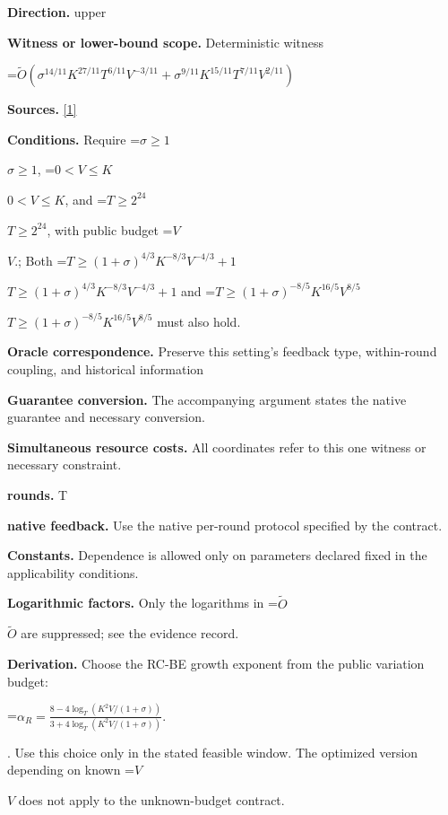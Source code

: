 \documentclass[10pt,a4paper]{article}
\newcommand{\AtlasMath}[1]{\par\begingroup\centering\setbox0=\hbox{$\displaystyle #1$}\ifdim\wd0>1.4\linewidth\typeout{ATLAS WIDE FORMULA: \the\wd0}\fi\ifdim\wd0>\linewidth\resizebox{\linewidth}{!}{\box0}\else\box0\fi\par\endgroup}
\newcommand{\AtlasInlineMath}[1]{\begingroup\setbox0=\hbox{$#1$}\ifdim\wd0>.4\linewidth\endgroup\AtlasMath{#1}\else\endgroup$#1$\fi}
\begin{document}
\textbf{Direction.} upper



\textbf{Witness or lower-bound scope.} Deterministic witness



\AtlasMath{\widetilde{O}\!\left(\sigma^{14/11}K^{27/11}T^{6/11}V^{-3/11}+\sigma^{9/11}K^{15/11}T^{7/11}V^{2/11}\right)}


\textbf{Sources.} \href{https://proceedings.nips.cc/paper_files/paper/2025/file/1aa670dafbd4b32ebf483f8372e612c5-Paper-Conference.pdf}{[1]}



\textbf{Conditions.} Require \AtlasInlineMath{\sigma\ge1}, \AtlasInlineMath{0<V\le K}, and \AtlasInlineMath{T\ge2^{24}}, with public budget \AtlasInlineMath{V}.; Both \AtlasInlineMath{T\ge(1+\sigma)^{4/3}K^{-8/3}V^{-4/3}+1} and \AtlasInlineMath{T\ge(1+\sigma)^{-8/5}K^{16/5}V^{8/5}} must also hold.



\textbf{Oracle correspondence.} Preserve this setting's feedback type, within-round coupling, and historical information



\textbf{Guarantee conversion.} The accompanying argument states the native guarantee and necessary conversion.



\textbf{Simultaneous resource costs.} All coordinates refer to this one witness or necessary constraint.



\textbf{rounds.} T



\textbf{native feedback.} Use the native per-round protocol specified by the contract.



\textbf{Constants.} Dependence is allowed only on parameters declared fixed in the applicability conditions.



\textbf{Logarithmic factors.} Only the logarithms in \AtlasInlineMath{\widetilde O} are suppressed; see the evidence record.



\textbf{Derivation.} Choose the RC-BE growth exponent from the public variation budget:
\AtlasMath{\alpha_R=\frac{8-4\log_T(K^2V/(1+\sigma))}{3+4\log_T(K^2V/(1+\sigma))}.}
. Use this choice only in the stated feasible window. The optimized version depending on known \AtlasInlineMath{V} does not apply to the unknown-budget contract.
\end{document}
